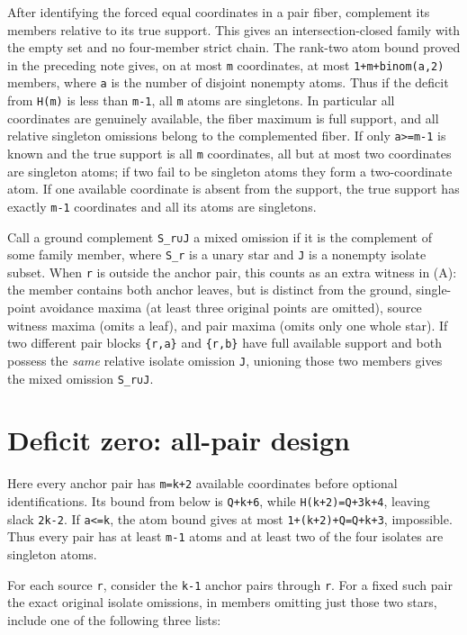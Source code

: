 \documentclass[11pt,letterpaper]{article}
\begin{document}
After identifying the forced equal coordinates in a pair fiber,
complement its members relative to its true support. This gives an
intersection-closed family with the empty set and no four-member strict
chain. The rank-two atom bound proved in the preceding note gives, on at
most \texttt{m} coordinates, at most \texttt{1+m+binom(a,2)} members,
where \texttt{a} is the number of disjoint nonempty atoms. Thus if the
deficit from \texttt{H(m)} is less than \texttt{m-1}, all \texttt{m}
atoms are singletons. In particular all coordinates are genuinely
available, the fiber maximum is full support, and all relative singleton
omissions belong to the complemented fiber. If only
\texttt{a\textgreater{}=m-1} is known and the true support is all
\texttt{m} coordinates, all but at most two coordinates are singleton
atoms; if two fail to be singleton atoms they form a two-coordinate
atom. If one available coordinate is absent from the support, the true
support has exactly \texttt{m-1} coordinates and all its atoms are
singletons.

Call a ground complement \texttt{S\_r∪J} a mixed omission if it is the
complement of some family member, where \texttt{S\_r} is a unary star
and \texttt{J} is a nonempty isolate subset. When \texttt{r} is outside
the anchor pair, this counts as an extra witness in (A): the member
contains both anchor leaves, but is distinct from the ground,
single-point avoidance maxima (at least three original points are
omitted), source witness maxima (omits a leaf), and pair maxima (omits
only one whole star). If two different pair blocks \texttt{\{r,a\}} and
\texttt{\{r,b\}} have full available support and both possess the
\emph{same} relative isolate omission \texttt{J}, unioning those two
members gives the mixed omission \texttt{S\_r∪J}.

\section{Deficit zero: all-pair
design}\label{3-deficit-zero-all-pair-design}

Here every anchor pair has \texttt{m=k+2} available coordinates before
optional identifications. Its bound from below is \texttt{Q+k+6}, while
\texttt{H(k+2)=Q+3k+4}, leaving slack \texttt{2k-2}. If
\texttt{a\textless{}=k}, the atom bound gives at most
\texttt{1+(k+2)+Q=Q+k+3}, impossible. Thus every pair has at least
\texttt{m-1} atoms and at least two of the four isolates are singleton
atoms.

For each source \texttt{r}, consider the \texttt{k-1} anchor pairs
through \texttt{r}. For a fixed such pair the exact original isolate
omissions, in members omitting just those two stars, include one of the
following three lists:
\end{document}
